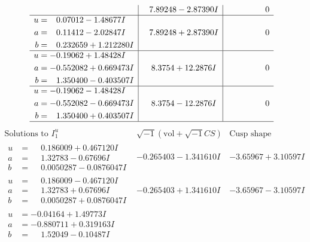 \documentclass[1p]{elsarticle_modified}
\theoremstyle{definition}
\newcommand{\I}{\sqrt{-1}}
\begin{document}
$$\begin{array}{c|c|c}
 & \phantom{-}7.89248 - 2.87390 I & \phantom{-0.000000 } 0 \\ \hline\begin{aligned}
u &= \phantom{-}0.07012 - 1.48677 I \\
a &= \phantom{-}0.11412 - 2.02847 I \\
b &= \phantom{-}0.232659 + 1.212280 I\end{aligned}
 & \phantom{-}7.89248 + 2.87390 I & \phantom{-0.000000 } 0 \\ \hline\begin{aligned}
u &= -0.19062 + 1.48428 I \\
a &= -0.552082 + 0.669473 I \\
b &= \phantom{-}1.350400 - 0.403507 I\end{aligned}
 & \phantom{-}8.3754 + 12.2876 I & \phantom{-0.000000 } 0 \\ \hline\begin{aligned}
u &= -0.19062 - 1.48428 I \\
a &= -0.552082 - 0.669473 I \\
b &= \phantom{-}1.350400 + 0.403507 I\end{aligned}
 & \phantom{-}8.3754 - 12.2876 I & \phantom{-0.000000 } 0\\
 \hline 
 \end{array}$$\newpage$$\begin{array}{c|c|c}  
\text{Solutions to }I^u_{1}& \I (\text{vol} + \sqrt{-1}CS) & \text{Cusp shape}\\
 \hline 
\begin{aligned}
u &= \phantom{-}0.186009 + 0.467120 I \\
a &= \phantom{-}1.32783 - 0.67696 I \\
b &= \phantom{-}0.0050287 - 0.0876047 I\end{aligned}
 & -0.265403 - 1.341610 I & -3.65967 + 3.10597 I \\ \hline\begin{aligned}
u &= \phantom{-}0.186009 - 0.467120 I \\
a &= \phantom{-}1.32783 + 0.67696 I \\
b &= \phantom{-}0.0050287 + 0.0876047 I\end{aligned}
 & -0.265403 + 1.341610 I & -3.65967 - 3.10597 I \\ \hline\begin{aligned}
u &= -0.04164 + 1.49773 I \\
a &= -0.880711 + 0.319163 I \\
b &= \phantom{-}1.52049 - 0.10487 I\end{aligned}

\end{array}$$
\end{document}
